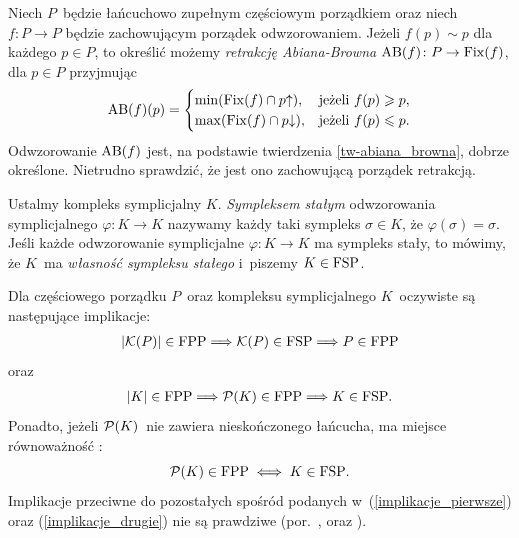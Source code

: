 Niech $P$~będzie łańcuchowo zupełnym częściowym porządkiem oraz niech $f\colon P\to P$ będzie zachowującym porządek odwzorowaniem. Jeżeli $f(p)\sim p$ dla każdego $p\in P$, to określić możemy \textit{retrakcję Abiana-Browna} $\operatorname{AB}(f)\colon P\to \operatorname{Fix}(f)$, dla $p\in P$ przyjmując 
\[\operatorname{AB}(f)(p)=\begin{cases}\min(\operatorname{Fix}(f)\cap p\mathord{\uparrow}), &\text{jeżeli } f(p)\geqslant p,\\\max(\operatorname{Fix}(f)\cap p\mathord{\downarrow}), &\text{jeżeli } f(p)\leqslant p.\end{cases}\] Odwzorowanie $\operatorname{AB}(f)$ jest, na podstawie twierdzenia \ref{tw-abiana_browna}, dobrze określone. Nietrudno sprawdzić, że jest ono zachowującą porządek retrakcją.

Ustalmy kompleks symplicjalny $K$. \textit{Sympleksem stałym} odwzorowania symplicjalnego  $\varphi\colon K\to K$ nazywamy każdy taki sympleks $\sigma\in K$, że $\varphi(\sigma)=\sigma$. Jeśli każde odwzorowanie symplicjalne $\varphi\colon K\to K$ ma sympleks stały, to mówimy, że $K$~ma \textit{własność sympleksu stałego} i~piszemy $K\in\mathrm{FSP}$.

Dla częściowego porządku $P$~oraz kompleksu symplicjalnego $K$~oczywiste są następujące implikacje:
\begin{align}
|\mathcal{K}(P)|\in\mathrm{FPP} \Longrightarrow \mathcal{K}(P)\in\mathrm{FSP} \Longrightarrow P\in\mathrm{FPP}\label{implikacje_pierwsze}\end{align}
oraz
\begin{align}|K|\in\mathrm{FPP} \Longrightarrow \mathcal{P}(K)\in\mathrm{FPP} \Longrightarrow K\in\mathrm{FSP}.\label{implikacje_drugie}\end{align}
Ponadto, jeżeli $\mathcal{P}(K)$~nie zawiera nieskończonego łańcucha, ma miejsce równoważność \cite[Proposition 6.3.15]{Schroder03}\label{schroder-fsp-wtw-fpp}: \[\mathcal{P}(K)\in\mathrm{FPP} \iff K\in\mathrm{FSP}.\] Implikacje przeciwne do pozostałych spośród podanych w~(\ref{implikacje_pierwsze}) oraz (\ref{implikacje_drugie}) nie są prawdziwe (por.~\cite[Example 2.4]{Baclawski79}, \cite[Example 6.3.6]{Schroder03} oraz \cite{13034}).

